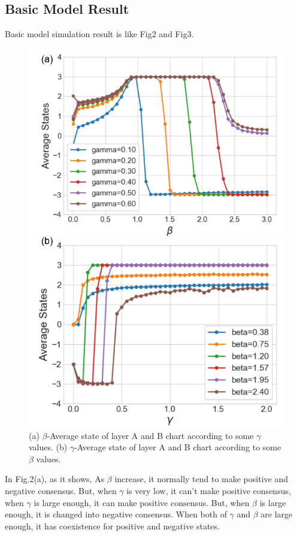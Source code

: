 \documentclass[english]{cccconf}
\begin{document}
\subsection{Basic Model Result}
Basic model simulation result is like Fig2 and Fig3.
\begin{figure}[!htb]
  \centering
  \includegraphics[width=\hsize]{FIG2.png}
  \caption{(a) $\beta$-Average state of layer A and B chart according to some $\gamma$ values. (b) $\gamma$-Average state of layer A and B chart according to some $\beta$ values.}
  \label{Fig2}
\end{figure}

In Fig.2(a), as it shows, As $\beta$ increase, it normally tend to make positive and negative consensus. But, when $\gamma$ is very low, it can’t make positive consensus, when $\gamma$ is large enough, it can make positive consensus. But, when $\beta$ is large enough, it is changed into negative consensus. When both of $\gamma$ and $\beta$ are large enough, it has coexistence for positive and negative states. 
\end{document}

